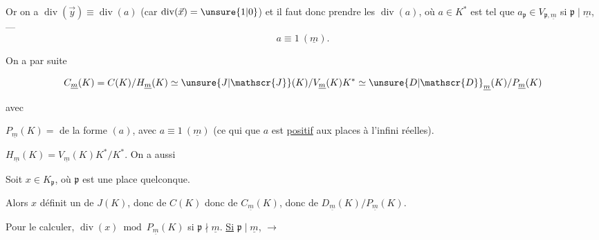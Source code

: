Or on a $\operatorname{div}(\vec y)\equiv\operatorname{div}(a)$ (car $\operatorname{div}(\vec x)=\unsure{1|0}$) et il faut donc prendre les $\operatorname{div}(a)$, où $a\in K^*$ est tel que $a_{\mathfrak p}\in V_{\mathfrak p,\underline m}$ si $\mathfrak p\mid\underline m$, --- 
\[
a\equiv1\ (\underline m).
\]

On a par suite

\[
C_{\underline m}(K)=C(K)/H_{\underline m}(K)\simeq\unsure{J|\mathscr{J}}(K)/V_{\underline m}(K)K^*\simeq{\unsure{D|\mathscr{D}}}_{\underline m}(K)/P_{\underline m}(K)
\]

avec

$P_{\underline m}(K)=$  de la forme $(a)$, avec $a\equiv1\ (\underline m)$ (ce qui   que $a$ est \uline{positif} aux places à l'infini réelles).

$H_{\underline m}(K)=V_{\underline m}(K)K^*/K^*$. On a aussi


Soit $x\in K_{\mathfrak p}$, où $\mathfrak p$ est une place quelconque.

Alors $x$ définit un  de $J(K)$, donc de $C(K)$ donc de $C_{\underline m}(K)$, donc de $D_{\underline m}(K)/P_{\underline m}(K)$.

Pour le calculer,    $\operatorname{div}(x)\bmod P_{\underline m}(K)$ si $\mathfrak p\nmid\underline m$. \uline{Si} $\mathfrak p\mid\underline m$, $\longrightarrow$
